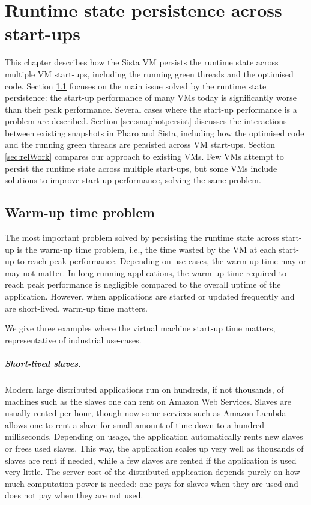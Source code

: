 \documentclass[a4paper,12pt,twoside]{../includes/ThesisStyle}
\begin{document}
\fi

\chapter{Runtime state persistence across start-ups}
\label{chap:persistence}
\minitoc

This chapter describes how the Sista VM persists the runtime state across multiple VM start-ups, including the running green threads and the optimised code. Section \ref{sec:warmup} focuses on the main issue solved by the runtime state persistence: the start-up performance of many VMs today is significantly worse than their peak performance. Several cases where the start-up performance is a problem are described. Section \ref{sec:snaphotpersist} discusses the interactions between existing snapshots in Pharo and Sista, including how the optimised code and the running green threads are persisted across VM start-ups. Section \ref{sec:relWork} compares our approach to existing VMs. Few VMs attempt to persist the runtime state across multiple start-ups, but some VMs include solutions to improve start-up performance, solving the same problem.

\section{Warm-up time problem}
\label{sec:warmup}

The most important problem solved by persisting the runtime state across start-up is the warm-up time problem, i.e., the time wasted by the VM at each start-up to reach peak performance. Depending on use-cases, the warm-up time may or may not matter. In long-running applications, the warm-up time required to reach peak performance is negligible compared to the overall uptime of the application. However, when applications are started or updated frequently and are short-lived, warm-up time matters.

We give three examples where the virtual machine start-up time matters, representative of industrial use-cases.

\paragraph{Short-lived slaves.}
Modern large distributed applications run on hundreds, if not thousands, of machines such as the slaves one can rent on Amazon Web Services. Slaves are usually rented per hour, though now some services such as Amazon Lambda allows one to rent a slave for small amount of time down to a hundred milliseconds. Depending on usage, the application automatically rents new slaves or frees used slaves. This way, the application scales up very well as thousands of slaves are rent if needed, while a few slaves are rented if the application is used very little. The server cost of the distributed application depends purely on how much computation power is needed: one pays for slaves when they are used and does not pay when they are not used.
\end{document}
